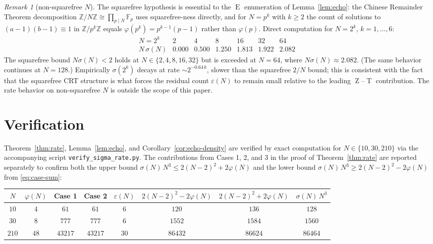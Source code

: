 \documentclass[11pt,reqno]{amsart}
\theoremstyle{plain}
\theoremstyle{definition}
\theoremstyle{remark}
\newtheorem*{remark}{Remark}
\DeclareMathOperator{\ECHO}{E}
\DeclareMathOperator{\HARM}{T}
\DeclareMathOperator{\VOID}{Z}
\newcommand{\ZN}{\mathbb{Z}/N\mathbb{Z}}
\newcommand{\Z}{\mathbb{Z}}
\begin{document}
\begin{remark}[non-squarefree $N$]
The squarefree hypothesis is essential to the $\ECHO$ enumeration of
Lemma~\ref{lem:echo}: the Chinese Remainder Theorem decomposition
$\ZN\cong\prod_{p\mid N}\mathbb F_{p}$ uses squarefree-ness directly,
and for $N=p^{k}$ with $k\ge 2$ the count of solutions to
$(a-1)(b-1)\equiv 1$ in $\Z/p^{k}\Z$ equals $\varphi(p^{k})=p^{k-1}(p-1)$
rather than $\varphi(p)$. Direct computation for $N=2^{k}$, $k=1,\ldots,6$:
\[
\begin{array}{c|cccccc}
N=2^{k}      & 2     & 4     & 8     & 16    & 32    & 64 \\
\hline
N\,\sigma(N) & 0.000 & 0.500 & 1.250 & 1.813 & 1.922 & 2.082
\end{array}
\]
The squarefree bound $N\sigma(N) < 2$ holds at $N \in \{2, 4, 8, 16, 32\}$
but is exceeded at $N = 64$, where $N\sigma(N) \approx 2.082$. (The same
behavior continues at $N = 128$.) Empirically $\sigma(2^{k})$ decays at
rate $\sim 2^{-0.64\,k}$, slower than the squarefree $2/N$ bound; this
is consistent with the fact that the squarefree CRT structure is what
forces the residual count $\varepsilon(N)$ to remain small relative
to the leading $\VOID$--$\HARM$ contribution. The rate behavior on
non-squarefree $N$ is outside the scope of this paper.
\end{remark}

\section{Verification}\label{sec:verify}

Theorem~\ref{thm:rate}, Lemma~\ref{lem:echo}, and
Corollary~\ref{cor:echo-density} are verified by exact computation
for $N\in\{10,30,210\}$ via the accompanying script
\texttt{verify\_sigma\_rate.py}. The contributions from Cases 1, 2,
and 3 in the proof of Theorem~\ref{thm:rate} are reported separately
to confirm both the upper bound $\sigma(N)\,N^{3}\le 2(N-2)^{2}+2\varphi(N)$
and the lower bound $\sigma(N)\,N^{3}\ge 2(N-2)^{2}-2\varphi(N)$ from
\eqref{eq:case-sum}:

\begin{center}
\begin{tabular}{c|c|c|c|c|c|c|c}
$N$ & $\varphi(N)$ & Case 1 & Case 2 & $\varepsilon(N)$ &
$2(N-2)^{2}-2\varphi(N)$ &
$2(N-2)^{2}+2\varphi(N)$ & $\sigma(N)\,N^{3}$\\
\hline
$10$  & $4$  & $61$    & $61$    & $6$  & $120$    & $136$    & $128$\\
$30$  & $8$  & $777$   & $777$   & $6$  & $1552$   & $1584$   & $1560$\\
$210$ & $48$ & $43217$ & $43217$ & $30$ & $86432$  & $86624$  & $86464$\\
\end{tabular}
\end{center}
\end{document}
